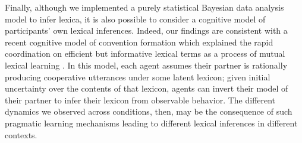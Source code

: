 \documentclass[10pt,letterpaper]{article}
\newcommand{\ndg}[1]{\textcolor{Green}{[ndg: #1]}}
\newcommand{\mf}[1]{\textcolor{Red}{[ndg: #1]}}
\begin{document}



Finally, although we implemented a purely statistical Bayesian data analysis model to infer lexica, it is also possible to consider a cognitive model of participants' own lexical inferences. Indeed, our findings are consistent with a recent cognitive model of convention formation which explained the rapid coordination on efficient but informative lexical terms as a process of mutual lexical learning \cite{HawkinsFrankGoodman17_ConventionFormation}. %
In this model, each agent assumes their partner is rationally producing cooperative utterances under some latent lexicon; given initial uncertainty over the contents of that lexicon, agents can invert their model of their partner to infer their lexicon from observable behavior. 
The different dynamics we observed across conditions, then, may be the consequence of such pragmatic learning mechanisms leading to different lexical inferences in different contexts.%
\end{document}
